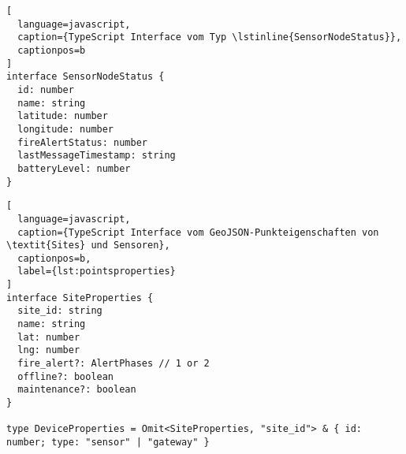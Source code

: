 \begin{lstlisting}[
  language=javascript,
  caption={TypeScript Interface vom Typ \lstinline{SensorNodeStatus}},
  captionpos=b
]
interface SensorNodeStatus {
  id: number
  name: string
  latitude: number
  longitude: number
  fireAlertStatus: number
  lastMessageTimestamp: string
  batteryLevel: number
}
\end{lstlisting}

\begin{lstlisting}[
  language=javascript,
  caption={TypeScript Interface vom GeoJSON-Punkteigenschaften von \textit{Sites} und Sensoren},
  captionpos=b,
  label={lst:pointsproperties}
]
interface SiteProperties {
  site_id: string
  name: string
  lat: number
  lng: number
  fire_alert?: AlertPhases // 1 or 2
  offline?: boolean
  maintenance?: boolean
}

type DeviceProperties = Omit<SiteProperties, "site_id"> & { id: number; type: "sensor" | "gateway" }
\end{lstlisting}